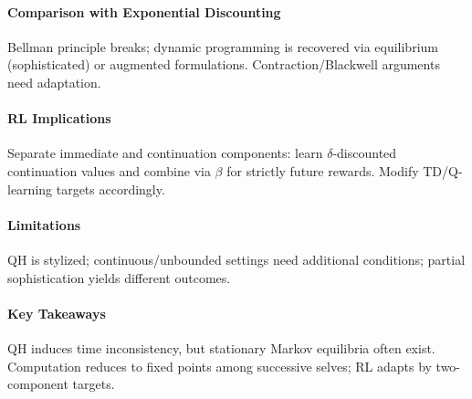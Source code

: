 \paragraph{Comparison with Exponential Discounting}
Bellman principle breaks; dynamic programming is recovered via equilibrium (sophisticated) or augmented formulations. Contraction/Blackwell arguments need adaptation.

\paragraph{RL Implications}
Separate immediate and continuation components: learn $\delta$-discounted continuation values and combine via $\beta$ for strictly future rewards. Modify TD/Q-learning targets accordingly.

\paragraph{Limitations}
QH is stylized; continuous/unbounded settings need additional conditions; partial sophistication yields different outcomes.

\paragraph{Key Takeaways}
QH induces time inconsistency, but stationary Markov equilibria often exist. Computation reduces to fixed points among successive selves; RL adapts by two-component targets.

